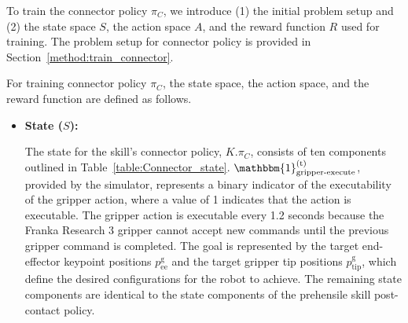 To train the connector policy \( \pi_C\), we introduce (1) the initial problem setup and (2) the state space $S$, the action space $A$, and the reward function $R$ used for training. The problem setup for connector policy is provided in Section~\ref{method:train_connector}.

For training connector policy $\pi_C$, the state space, the action space, and the reward function are defined as follows. 

\begin{itemize}
    \item \textbf{State (\( S \)):} %
    
    The state for the skill's connector policy, \( K.\pi_C \), consists of ten components outlined in Table~\ref{table:Connector_state}. 
    \(\mathbbm{1}^\text{(t)}_\text{gripper-execute}\), provided by the simulator, represents a binary indicator of the executability of the gripper action, where a value of 1 indicates that the action is executable. The gripper action is executable every 1.2 seconds because the Franka Research 3 gripper cannot accept new commands until the previous gripper command is completed. The goal is represented by the target end-effector keypoint positions \( p^\text{g}_\text{ee} \) and the target gripper tip positions \( p^\text{g}_\text{tip} \), which define the desired configurations for the robot to achieve. The remaining state components are identical to the state components of the prehensile skill post-contact policy.


\end{itemize}

